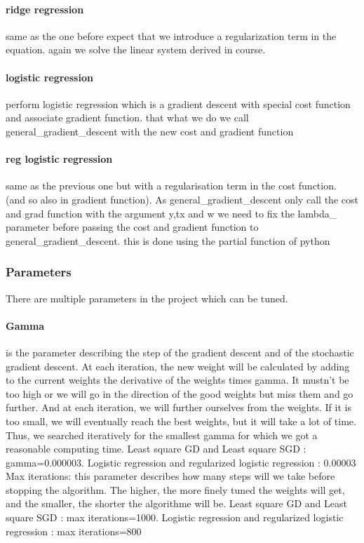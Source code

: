 \documentclass[10pt,conference,compsocconf]{IEEEtran}
\begin{document}
\paragraph{ridge regression}

same as the one before expect that we introduce a regularization term in the equation. again we solve the linear system derived in course.

\paragraph{logistic regression}

perform logistic regression which is a gradient descent with special cost function and associate gradient function. that what we do we call general\_gradient\_descent with the new cost and gradient function 

\paragraph{reg logistic regression}
same as the previous one but with a regularisation term in the cost function. (and so also in gradient function). As general\_gradient\_descent only call the cost and grad function with the argument y,tx and w we need to fix the lambda\_ parameter before passing the cost and gradient function to general\_gradient\_descent. this is done using the partial function of python

\subsubsection{Parameters}
There are multiple parameters in the project which can be tuned. 
\paragraph{Gamma} is the parameter describing the step of the gradient descent and of the stochastic gradient descent. At each iteration, the new weight will be calculated by adding to the current weights the derivative of the weights times gamma. It mustn’t be too high or we will go in the direction of the good weights but miss them and go further. And at each iteration, we will further ourselves from the weights. If it is too small, we will eventually reach the best weights, but it will take a lot of time. Thus, we searched iteratively for the smallest gamma for which we got a reasonable computing time.
Least square GD and Least square SGD : gamma=0.000003.
Logistic regression and regularized logistic regression : 0.00003
Max iterations: this parameter describes how many steps will we take before stopping the algorithm. The higher, the more finely tuned the weights will get, and the smaller, the shorter the algorithme will be. 
Least square GD and Least square SGD : max iterations=1000.
Logistic regression and regularized logistic regression :  max iterations=800
\end{document}
